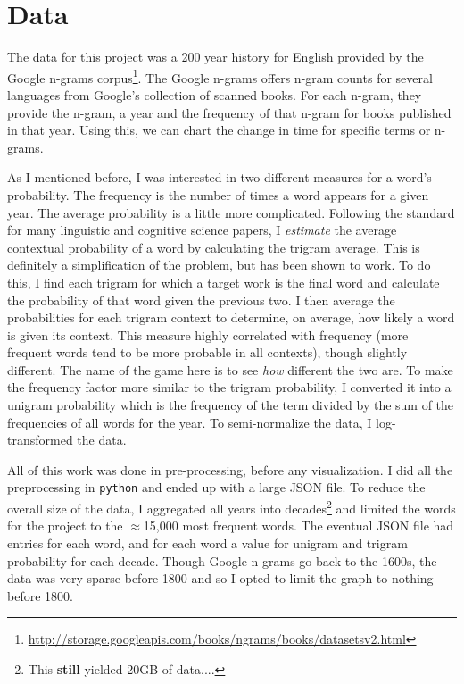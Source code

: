 \documentclass[11pt]{article}
\begin{document}
\section{Data}

The data for this project was a 200 year history for English provided by the Google n-grams corpus\footnote{\url{http://storage.googleapis.com/books/ngrams/books/datasetsv2.html}}. The Google n-grams offers n-gram counts for several languages from Google's collection of scanned books. For each n-gram, they provide the n-gram, a year and the frequency of that n-gram for books published in that year. Using this, we can chart the change in time for specific terms or n-grams.

As I mentioned before, I was interested in two different measures for a word's probability. The frequency is the number of times a word appears for a given year. The average probability is a little more complicated. Following the standard for many linguistic and cognitive science papers, I {\it estimate} the average contextual probability of a word by calculating the trigram average. This is definitely a simplification of the problem, but has been shown to work. To do this, I find each trigram for which a target work is the final word and calculate the probability of that word given the previous two. I then average the probabilities for each trigram context to determine, on average, how likely a word is given its context. This measure highly correlated with frequency (more frequent words tend to be more probable in all contexts), though slightly different. The name of the game here is to see {\it how} different the two are. To make the frequency factor more similar to the trigram probability, I converted it into a unigram probability which is the frequency of the term divided by the sum of the frequencies of all words for the year. To semi-normalize the data, I log-transformed the data.

All of this work was done in pre-processing, before any visualization. I did all the preprocessing in {\tt python} and ended up with a large JSON file. To reduce the overall size of the data, I aggregated all years into decades\footnote{This {\bf still} yielded 20GB of data....} and limited the words for the project to the $\approx$15,000 most frequent words. The eventual JSON file had entries for each word, and for each word a value for unigram and trigram probability for each decade. Though Google n-grams go back to the 1600s, the data was very sparse before 1800 and so I opted to limit the graph to nothing before 1800. 
\end{document}
